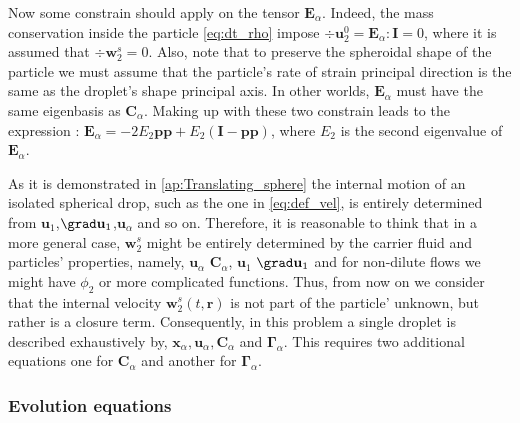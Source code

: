 Now some constrain should apply on the tensor $\textbf{E}_\alpha$.
Indeed, the mass conservation inside the particle \ref{eq:dt_rho} impose $\div \textbf{u}_2^0 = \textbf{E}_\alpha : \textbf{I}= 0$, where it is assumed that $\div \textbf{w}_2^s =0$. 
Also, note that to preserve the spheroidal shape of the particle we must assume that the particle's rate of strain principal direction is the same as the droplet's shape principal axis. 
In other worlds, $\textbf{E}_\alpha$ must have the same eigenbasis as $\textbf{C}_\alpha$. 
Making up with these two constrain leads to the expression : $\textbf{E}_\alpha = -2 E_2 \textbf{pp} + E_2 (\textbf{I}- \textbf{pp})$, where $E_2$ is the second eigenvalue of $\textbf{E}_\alpha$. 


As it is demonstrated in \ref{ap:Translating_sphere} the internal motion of an isolated spherical drop, such as the one in \ref{eq:def_vel}, is entirely determined  from $\textbf{u}_1$,$\grad\textbf{u}_1$,$\textbf{u}_\alpha$ and so on. 
Therefore, it is reasonable to think that in a more general case, $\textbf{w}_2^s$ might be entirely determined by the carrier fluid and particles' properties, namely, $\textbf{u}_\alpha$ $\textbf{C}_\alpha$, $\textbf{u}_1$ $\grad\textbf{u}_1$ and for non-dilute flows we might have $\phi_2$ or more complicated functions. 
Thus, from now on we consider that the internal velocity $\textbf{w}^{s}_2(t,\textbf{r})$ is not part of the particle' unknown, but rather is a closure term. 
Consequently, in this problem a single droplet is described exhaustively by, $\textbf{x}_\alpha, \textbf{u}_\alpha, \textbf{C}_\alpha$ and $\bm\Gamma_\alpha$. 
This requires two additional equations one for $\textbf{C}_\alpha$ and another for $\bm\Gamma_\alpha$. 

\subsubsection*{Evolution equations}

